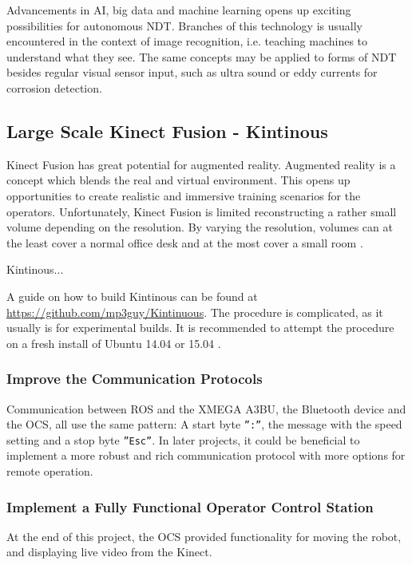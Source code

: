 Advancements in \ac{AI}, big data and machine learning opens up exciting possibilities for autonomous \ac{NDT}. Branches of this technology is usually encountered in the context of image recognition, i.e. teaching machines to understand what they see. The same concepts may be applied to forms of \ac{NDT} besides regular visual sensor input, such as ultra sound or eddy currents for corrosion detection.  

\subsection{Large Scale Kinect Fusion - Kintinous}

Kinect Fusion has great potential for augmented reality. Augmented reality is a concept which blends the real and virtual environment. This opens up opportunities to create realistic and immersive training scenarios for the operators. Unfortunately, Kinect Fusion is limited reconstructing a rather small volume depending on the resolution. By varying the resolution, volumes can at the least cover a normal office desk and at the most cover a small room \cite{keylist}.  

Kintinous...

A guide on how to build Kintinous can be found  at \href{Github}{https://github.com/mp3guy/Kintinuous}. The procedure is complicated, as it usually is for experimental builds. It is recommended to attempt the procedure on a fresh install of Ubuntu 14.04 or 15.04 \cite{Kintinous}.

\subsubsection{Improve the Communication Protocols}

Communication between \ac{ROS} and the XMEGA A3BU, the Bluetooth device and the \ac{OCS}, all use the same pattern: A start byte \texttt{'':''}, the message with the speed setting and a stop byte \texttt{''Esc''}. In later projects, it could be beneficial to implement a more robust and rich communication protocol with more options for remote operation. 

\subsubsection{Implement a Fully Functional Operator Control Station}

At the end of this project, the \ac{OCS} provided functionality for moving the robot, and displaying live video from the Kinect. 


